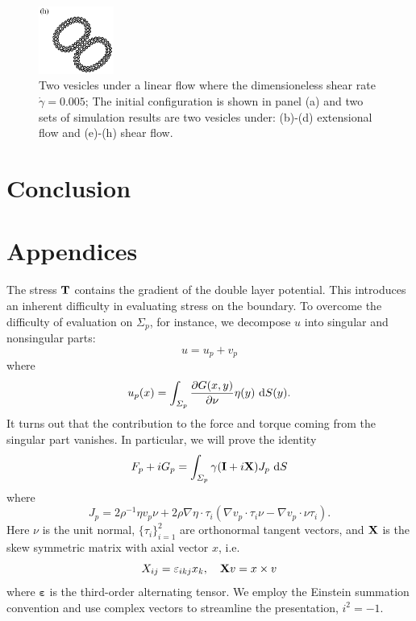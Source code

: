\documentclass[lineno]{jfm}
\begin{document}
\begin{figure}[H]
\begin{center}
\includegraphics[width=0.22\textwidth]{N116_shear_12000.eps}
\end{center}
  \caption{Two vesicles under a linear flow where the dimensioneless shear rate $\dot\gamma=0.005$; The initial configuration is shown in panel (a) and two sets of simulation results are two vesicles under: 
  (b)-(d) extensional flow and (e)-(h) shear flow. 
  }
    \label{figure5}
\end{figure}



\section{\label{conclusion}Conclusion}


\begin{acknowledgments}
\end{acknowledgments}

\appendix

\section{Appendices}
The stress ${\bf T}$ contains the gradient of the double layer potential. This 
introduces an inherent difficulty in evaluating stress on the boundary.
To overcome the difficulty of evaluation on $\Sigma_p$, for instance, we decompose $u$ into singular and nonsingular parts:
\begin{equation}
u = u_p + v_p
\end{equation}
where  
\begin{equation}
u_p(x) = \int_{\Sigma_p} \frac{\partial G(x,y)}{\partial \nu} \eta(y) \,\dif S(y).
\end{equation}
It turns out that the contribution to the force and torque coming from the singular
part vanishes. In particular, we will prove the identity
\begin{equation}
\label{eq:recipforcetorque}
F_p + iG_p= \int_{\Sigma_p} \gamma ({\bf I}+i{\bf X})J_{p} \,\dif S
\end{equation}
where
 \begin{equation}
\label{eq:jumpstress1}
J_{p} = 2\rho^{-1} \eta  v_p \nu 
+ 2\rho \nabla \eta \cdot \tau_i(\nabla v_p \cdot \tau_i \nu -  \nabla v_p \cdot \nu \tau_i).
\end{equation}
Here $\nu$ is the unit normal, $\{\tau_i\}_{i=1}^2$ are orthonormal tangent vectors,
and ${\bf X}$ is the skew symmetric matrix with axial vector $x$, i.e.
\[X_{ij} = \varepsilon_{ikj}x_k,\quad {\bf X}v = x\times v\]
where $\boldsymbol{\varepsilon}$ is the third-order alternating tensor.
We employ the Einstein summation convention and use complex vectors to streamline the presentation, $i^2 = -1$.
\end{document}
